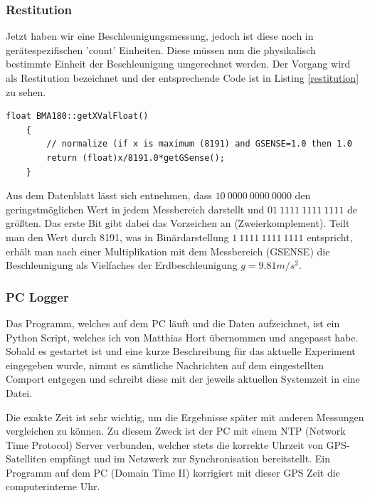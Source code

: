 \documentclass[12pt,a4paper]{scrartcl}
\begin{document}
\subsubsection{Restitution}

Jetzt haben wir eine Beschleunigungsmessung, jedoch ist diese noch in gerätespezifischen 'count' Einheiten. Diese müssen nun die physikalisch bestimmte Einheit der Beschleunigung umgerechnet werden. Der Vorgang wird als Restitution bezeichnet und der entsprechende Code ist in Listing \ref{restitution} zu sehen.

\begin{lstlisting}[frame=trBL]
	float BMA180::getXValFloat()
	{
	    // normalize (if x is maximum (8191) and GSENSE=1.0 then 1.0
	    return (float)x/8191.0*getGSense();
	}
\end{lstlisting}

Aus dem Datenblatt \citep{Sensortec:2009rt} lässt sich entnehmen, dass $10~0000~0000~0000$ den geringstmöglichen Wert in jedem Messbereich darstellt und $01~1111~1111~1111$ de größten. Das erste Bit gibt dabei das Vorzeichen an (Zweierkomplement). Teilt man den Wert durch 8191, was in Binärdarstellung $1~1111~1111~1111$ entspricht, erhält man nach einer Multiplikation mit dem Messbereich (GSENSE) die Beschleunigung als Vielfaches der Erdbeschleunigung $g = 9.81 m/s^2$.


\subsubsection{PC Logger}

Das Programm, welches auf dem PC läuft und die Daten aufzeichnet, ist ein Python Script, welches ich von Matthias Hort übernommen und angepasst habe. Sobald es gestartet ist und eine kurze Beschreibung für das aktuelle Experiment eingegeben wurde, nimmt es sämtliche Nachrichten auf dem eingestellten Comport entgegen und schreibt diese mit der jeweils aktuellen Systemzeit in eine Datei.

Die exakte Zeit ist sehr wichtig, um die Ergebnisse später mit anderen Messungen vergleichen zu können. Zu diesem Zweck ist der PC mit einem NTP (Network Time Protocol) Server verbunden, welcher stets die korrekte Uhrzeit von GPS-Satelliten empfängt und im Netzwerk zur Synchronisation bereitstellt. Ein Programm auf dem PC (Domain Time II) korrigiert mit dieser GPS Zeit die computerinterne Uhr.
\end{document}
